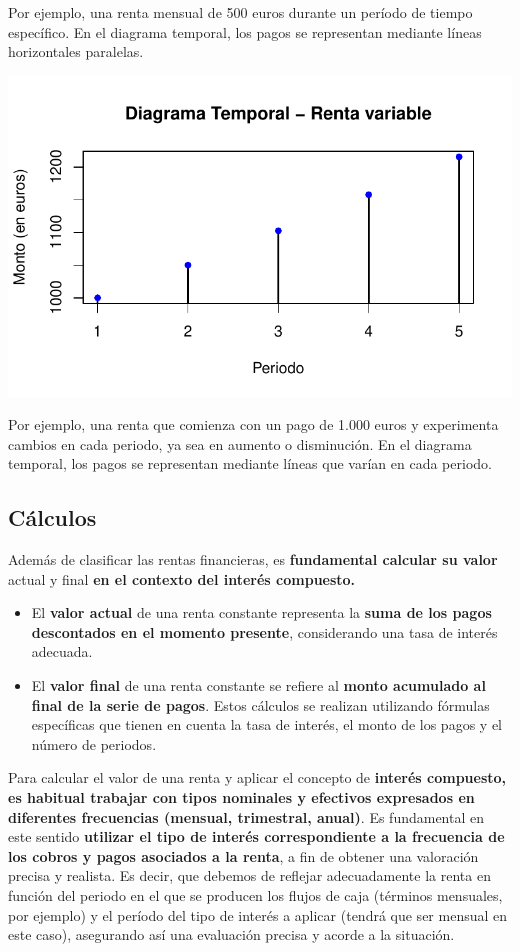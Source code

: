 \documentclass[
  letterpaper,
  DIV=11,
  numbers=noendperiod]{scrreprt}
\begin{document}
\begin{tcolorbox}
Por ejemplo, una renta mensual de 500 euros durante un período de tiempo
específico. En el diagrama temporal, los pagos se representan mediante
líneas horizontales paralelas.

\includegraphics{sesion02_renta_fija_files/figure-pdf/unnamed-chunk-2-1.pdf}

Por ejemplo, una renta que comienza con un pago de 1.000 euros y
experimenta cambios en cada periodo, ya sea en aumento o disminución. En
el diagrama temporal, los pagos se representan mediante líneas que
varían en cada periodo.

\subsection{Cálculos}\label{cuxe1lculos}

Además de clasificar las rentas financieras, es \textbf{fundamental
calcular su valor} actual y final \textbf{en el contexto del interés
compuesto.}

\begin{itemize}
\item
  El \textbf{valor actual} de una renta constante representa la
  \textbf{suma de los pagos descontados en el momento presente},
  considerando una tasa de interés adecuada.
\item
  El \textbf{valor final} de una renta constante se refiere al
  \textbf{monto acumulado al final de la serie de pagos}. Estos cálculos
  se realizan utilizando fórmulas específicas que tienen en cuenta la
  tasa de interés, el monto de los pagos y el número de periodos.
\end{itemize}

Para calcular el valor de una renta y aplicar el concepto de
\textbf{interés compuesto, es habitual trabajar con tipos nominales y
efectivos expresados en diferentes frecuencias (mensual, trimestral,
anual)}. Es fundamental en este sentido \textbf{utilizar el tipo de
interés correspondiente a la frecuencia de los cobros y pagos asociados
a la renta}, a fin de obtener una valoración precisa y realista. Es
decir, que debemos de reflejar adecuadamente la renta en función del
periodo en el que se producen los flujos de caja (términos mensuales,
por ejemplo) y el período del tipo de interés a aplicar (tendrá que ser
mensual en este caso), asegurando así una evaluación precisa y acorde a
la situación.


\end{tcolorbox}
\end{document}
